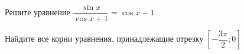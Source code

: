 \begin{ex}
	\begin{condition}
		\begin{enumcols}[label=\asbuk*)]
			\item Решите уравнение \( \dfrac{\sin x}{\cos x + 1} = \cos x - 1 \)
			\item Найдите все корни уравнения, принадлежащие отрезку \( \left[-\dfrac{3\pi}{2};0\right] \)
		\end{enumcols}
	\end{condition}
\end{ex}